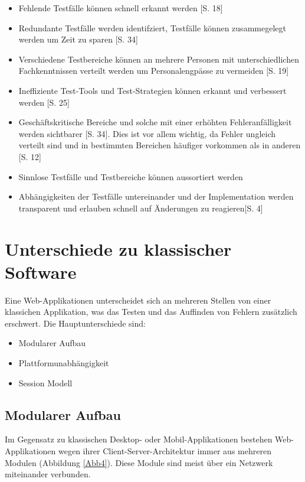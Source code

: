\documentclass[a4paper,bibtotoc,oneside]{scrbook}
\begin{document}
\begin{itemize}
	\item Fehlende Testfälle können schnell erkannt werden \cite{test_large_systems}[S. 18]
	\item Redundante Testfälle werden identifziert, Testfälle können zusammegelegt werden um Zeit zu sparen \cite{testing_apps_on_web}[S. 34]
	\item Verschiedene Testbereiche können an mehrere Personen mit unterschiedlichen Fachkenntnissen verteilt werden um Personalengpässe zu vermeiden \cite{test_large_systems}[S. 19]
	\item Ineffiziente Test-Tools und Test-Strategien können erkannt und verbessert werden \cite{eval_regression}[S. 25]
	\item Geschäftskritische Bereiche und solche mit einer erhöhten  Fehleranfälligkeit werden sichtbarer \cite{testing_apps_on_web}[S. 34]. Dies ist vor allem wichtig, da Fehler ungleich verteilt sind und in bestimmten Bereichen häufiger vorkommen als in anderen \cite{eval_regression}[S. 12]
	\item Sinnlose Testfälle und Testbereiche können aussortiert werden 
	\item Abhängigkeiten der Testfälle untereinander und der Implementation werden transparent und erlauben schnell auf Änderungen zu reagieren\cite{test_auto}[S. 4]
\end{itemize}

\chapter{Unterschiede zu klassischer Software}
Eine Web-Applikationen unterscheidet sich an mehreren Stellen von einer klassichen Applikation, was das Testen und das Auffinden von Fehlern zusätzlich erschwert. Die Hauptunterschiede sind:

\begin{itemize}
	\item Modularer Aufbau
	\item Plattformunabhängigkeit
	\item Session Modell
\end{itemize}


\section{Modularer Aufbau}

Im Gegensatz zu klassischen Desktop- oder Mobil-Applikationen bestehen Web-Applikationen wegen ihrer Client-Server-Architektur immer aus mehreren Modulen (Abbildung \ref{Abb4}). Diese Module sind meist über ein Netzwerk miteinander verbunden.
\end{document}
